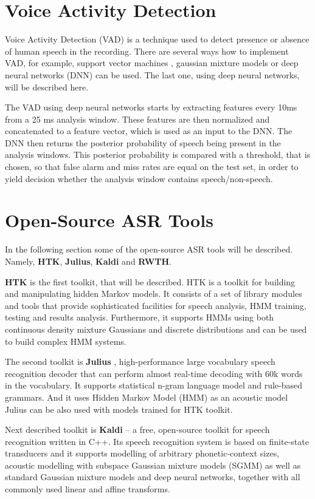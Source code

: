 \section{Voice Activity Detection}
Voice Activity Detection (VAD) is a technique used to detect presence or absence of human speech in the recording.
There are several ways how to implement VAD,
  for example, support vector machines \cite{mesgarani2006discrimination}, gaussian mixture models \cite{ng2012developing} or deep neural networks (DNN) \cite{ryant2013speech} can be used.
The last one, using deep neural networks, will be described here.

The VAD using deep neural networks starts by extracting features every 10ms from a 25 ms analysis window.
These features are then normalized and concatenated to a feature vector,
  which is used as an input to the DNN.
The DNN then returns the posterior probability of speech being present in the analysis windows.
This posterior probability is compared with a threshold,
  that is chosen,
  so that false alarm and miss rates are equal on the test set,
  in order to yield decision whether the analysis window contains speech/non-speech.

\section{Open-Source ASR Tools}
In the following section some of the open-source ASR tools will be described.
Namely, \textbf{HTK}, \textbf{Julius}, \textbf{Kaldi} and \textbf{RWTH}.

\textbf{HTK} \cite{young1997htk} is the first toolkit, that will be described.
HTK is a toolkit for building and manipulating hidden Markov models.
It consists of a set of library modules and tools that provide sophisticated facilities for speech analysis, HMM training, testing and results analysis.
Furthermore, it supports HMMs using both continuous density mixture Gaussians and discrete distributions and can be used to build complex HMM systems.

The second toolkit is \textbf{Julius} \cite{lee2001julius}, high-performance large vocabulary speech recognition decoder
  that can perform almost real-time decoding with 60k words in the vocabulary.
It supports statistical n-gram language model and rule-based grammars.
And it uses Hidden Markov Model (HMM) as an acoustic model
Julius can be also used with models trained for HTK toolkit.

Next described toolkit is \textbf{Kaldi} \cite{povey2011kaldi} -- a free, open-source toolkit for speech recognition written in C++.
Its speech recognition system is based on finite-state transducers
  and it supports modelling of arbitrary phonetic-context sizes,
  acoustic modelling with subspace Gaussian mixture models (SGMM)
  as well as standard Gaussian mixture models and deep neural networks,
  together with all commonly used linear and affine transforms.


